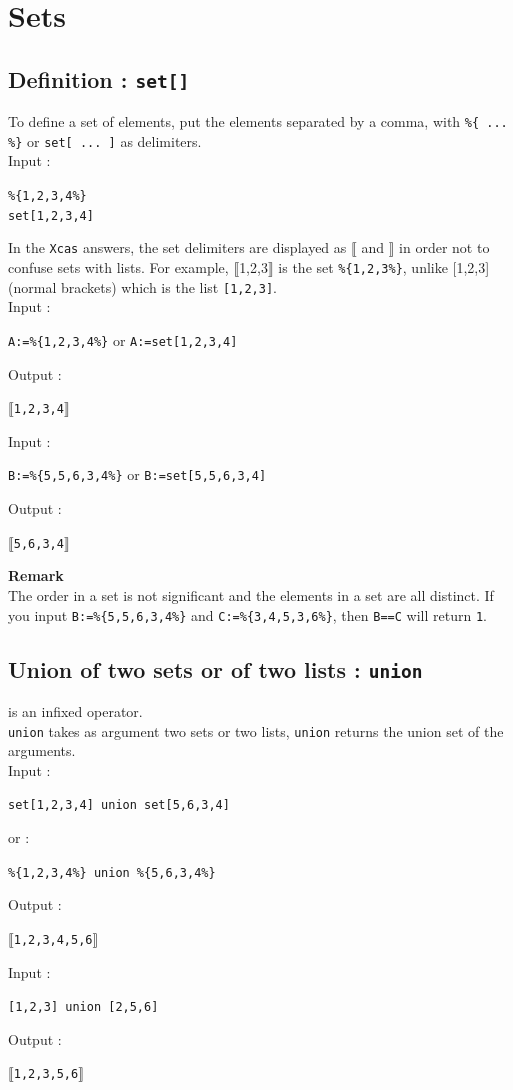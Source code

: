\documentclass[a4paper,11pt]{book}
\begin{document}
\section{Sets}
\subsection{Definition : {\tt set[]}}\index{\%\{ \%\}}
To define a set of elements, put the elements separated by a comma, with 
{\tt \%\{ ... \%\}} or {\tt set[ ... ]} as delimiters.\\
Input :
\begin{center}
{\tt \%\{1,2,3,4\%\}}\\
{\tt set[1,2,3,4]}
\end{center}
In the {\tt Xcas} answers, the set delimiters are displayed
as $\llbracket$ and $\rrbracket$ in order
not to confuse sets with lists.
For example, $\llbracket$1,2,3$\rrbracket$ is the set {\tt \%\{1,2,3\%\}}, 
unlike [1,2,3] (normal brackets) which is the list {\tt [1,2,3]}.\\
Input :
\begin{center}{\tt A:=\%\{1,2,3,4\%\}} or {\tt A:=set[1,2,3,4]}\end{center}
Output :
\begin{center}{\tt $\llbracket$1,2,3,4$\rrbracket$  }\end{center}
Input :
\begin{center}{\tt B:=\%\{5,5,6,3,4\%\}} or {\tt B:=set[5,5,6,3,4]}\end{center}
Output :
\begin{center}{\tt  $\llbracket$5,6,3,4$\rrbracket$ }\end{center}
{\bf Remark}\\
The order in a set is not significant and 
the elements in a set are all distinct. If you input
{\tt B:=\%\{5,5,6,3,4\%\}} and  {\tt C:=\%\{3,4,5,3,6\%\}}, then 
{\tt B==C} will return  {\tt 1}.

\subsection{Union of two sets or of two lists : {\tt union}}
 is an infixed operator.\\
{\tt union} takes as argument two sets or two lists,
{\tt union}  returns the union set of the arguments.\\
Input : 
\begin{center}{\tt set[1,2,3,4] union set[5,6,3,4]}\end{center}
or : 
\begin{center}{\tt \%\{1,2,3,4\%\} union \%\{5,6,3,4\%\}}\end{center}
Output :
\begin{center}{\tt $\llbracket$1,2,3,4,5,6$\rrbracket$}\end{center}
Input : 
\begin{center}{\tt [1,2,3] union [2,5,6]}\end{center}
Output :
\begin{center}{\tt $\llbracket$1,2,3,5,6$\rrbracket$}\end{center}
\end{document}
